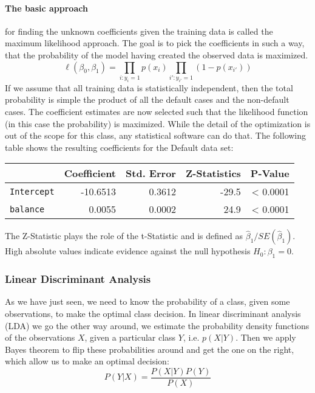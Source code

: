 \paragraph*{The basic approach}for  finding  the unknown  coefficients  given  the training  data  is  called  the  maximum likelihood  approach.
The goal  is  to  pick  the  coefficients  in such a  way,  that  the  probability  of the  model  having  created  the observed  data  is  maximized.
\[ \ell (\beta_0,\beta_1) = \prod_{i:y_i=1} p(x_i) \prod_{i':y_{i'}=1} (1 - p(x_{i'})) \]
If we assume that all  training  data is statistically  independent,  then the  total probability  is  simple  the  product  of all  the default cases  and  the  non-default cases. 
The coefficient  estimates  are now  selected such  that the  likelihood  function  (in  this case  the  probability)  is  maximized.
While the detail  of  the  optimization  is out  of  the  scope  for  this  class,  any statistical  software  can  do  that. The following table shows  the resulting  coefficients  for  the  Default data  set:  \\
\begin{center}
	\begin{tabular}{l|r r r r}
		& Coefficient & Std. Error & Z-Statistics & P-Value \\
		\hline
		\texttt{Intercept} & -10.6513 & 0.3612 & -29.5 & < 0.0001 \\
		\texttt{balance} & 0.0055 & 0.0002 & 24.9 & < 0.0001 \\
	\end{tabular}
\end{center}
The Z-Statistic plays the role of the t-Statistic  and is defined as $\hat{\beta}_1/SE(\hat{\beta}_1)$. 
High absolute values indicate evidence against the null hypothesis $H_0 : \beta_1=0$. \\

\subsubsection{Linear Discriminant Analysis}
As we have just seen, we need to know the probability of a class, given some observations, to make the optimal class decision.
In linear discriminant analysis (LDA) we go the other way around,
we estimate the probability density functions of the observations $X$, given a particular class $Y$, i.e. $p(X|Y)$.
Then we apply Bayes theorem to flip these probabilities around and get the one on the right, which allow us to make an optimal decision:
\[ P(Y|X)=\frac{P(X|Y)P(Y)}{P(X)} \]

